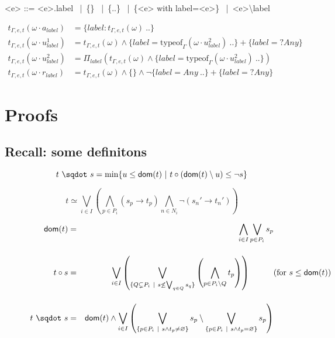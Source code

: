 \documentclass[a4paper]{article}%
\newcommand{\worra}[2]{#1\mathop{\,\sqdot\,} #2}
\newcommand{\apply}[2]{#1\circ#2}
\newcommand{\dom}[1]{\textsf{dom}(#1)}
\newcommand{\alt}{~|~}
\begin{document}
    \begin{grammar}
        \let\syntleft\relax
        \let\syntright\relax
        <e> ::= <e>.label \alt \{\} \alt \{..\} \alt \{<e> with label=<e>\} \alt <e>\textbackslash label
    \end{grammar}

    \begin{align*}
        t_{\Gamma,e,t}(\omega\cdot a_{label}) &= \{ label: t_{\Gamma,e,t}(\omega) \ .. \}\\
        t_{\Gamma,e,t}(\omega\cdot u_{label}^1) &= t_{\Gamma,e,t}(\omega) \land \{label=\text{typeof}_{\Gamma}(\omega \cdot u_{label}^2) \ .. \} + \{ label =? Any \}\\
        t_{\Gamma,e,t}(\omega\cdot u_{label}^2) &= \Pi_{label}(t_{\Gamma,e,t}(\omega) \land \{label=\text{typeof}_{\Gamma}(\omega \cdot u_{label}^2) \ .. \})\\
        t_{\Gamma,e,t}(\omega\cdot r_{label}) &= t_{\Gamma,e,t}(\omega) \land \{\} \land \neg \{label=Any \ .. \} + \{ label =? Any \}
    \end{align*}

    \section{Proofs}

    \subsection{Recall: some definitons}

    \[ \worra t s = \min \{ u \leq \dom t \alt \apply t {(\dom t \setminus u)} \leq \neg s \} \]

    \[ t \simeq \bigvee_{i\in I}\left(\bigwedge_{p\in P_i}(s_p\to t_p)\bigwedge_{n\in N_i}\neg(s_n'\to t_n')\right) \]

    \begin{eqnarray*}
        \dom{t}    & = & \bigwedge_{i\in I}\bigvee_{p\in P_i}s_p\\[4mm]
        \apply t s & = & \bigvee_{i\in I}\left(\bigvee_{\{Q\subsetneq P_i\alt s\not\leq\bigvee_{q\in Q}s_q\}}\left(\bigwedge_{p\in P_i\setminus Q}t_p\right)\right)\hspace*{1cm}\makebox[0cm][l]{(for $s\leq\dom{t}$)}\\[4mm]
        \worra t s & = & \dom t \wedge\bigvee_{i\in I}\left(\bigvee_{\{p\in P_i\alt s\wedge t_p\not=\varnothing\}}s_p \setminus \bigvee_{\{p\in P_i\alt s\wedge t_p=\varnothing\}}s_p \right)
    \end{eqnarray*}
    \pagebreak
\end{document}
